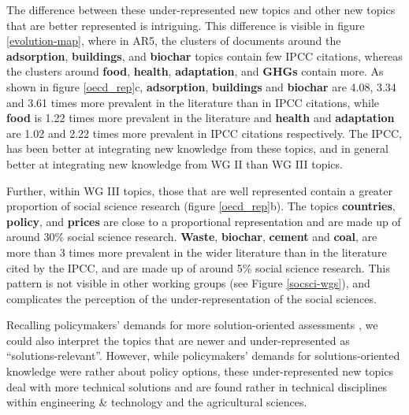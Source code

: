 \documentclass{article}
\begin{document}
\begin{linenumbers}
		
		The difference between these under-represented new topics and other new topics that are better represented is intriguing. This difference is visible in figure \ref{evolution-map}, where in AR5, the clusters of documents around the \textbf{adsorption}, \textbf{buildings}, and \textbf{biochar} topics contain few IPCC citations, whereas the clusters around \textbf{food}, \textbf{health}, \textbf{adaptation}, and \textbf{GHGs} contain more. As shown in figure \ref{oecd_rep}c, \textbf{adsorption}, \textbf{buildings} and \textbf{biochar} are 4.08, 3.34 and 3.61 times more prevalent in the literature than in IPCC citations, while \textbf{food} is 1.22 times more prevalent in the literature and \textbf{health} and \textbf{adaptation} are 1.02 and 2.22 times more prevalent in IPCC citations respectively. The IPCC, has been better at integrating new knowledge from these topics, and in general better at integrating new knowledge from WG II than WG III topics.
		
		Further, within WG III topics, those that are well represented contain a greater proportion of social science research (figure \ref{oecd_rep}b). The topics \textbf{countries}, \textbf{policy}, and \textbf{prices} are close to a proportional representation and are made up of around 30\% social science research. \textbf{Waste}, \textbf{biochar}, \textbf{cement} and \textbf{coal}, are more than 3 times more prevalent in the wider literature than in the literature cited by the IPCC, and are made up of around 5\% social science research. This pattern is not visible in other working groups (see Figure \ref{socsci-wgs}), and complicates the perception of the under-representation of the social sciences.
		
		
		Recalling policymakers' demands for more solution-oriented assessments \cite{Kowarsch2017}, we could also interpret the topics that are newer and under-represented as ``solutions-relevant''. However, while policymakers' demands for solutions-oriented knowledge were rather about policy options, these under-represented new topics deal with more technical solutions and are found rather in technical disciplines within engineering \& technology and the agricultural sciences.
		

\end{linenumbers}
\end{document}

